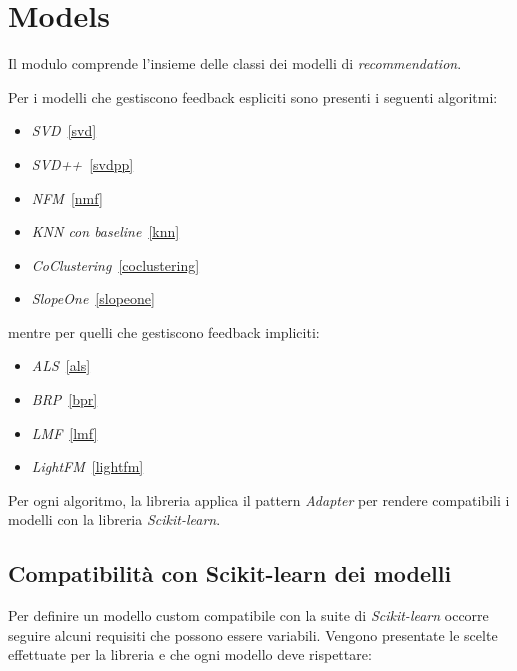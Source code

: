 \section{Models}
Il modulo comprende l'insieme delle classi dei modelli di \textit{recommendation}.

Per i modelli che gestiscono feedback espliciti sono presenti i seguenti algoritmi:

\begin{itemize}
    \item \textit{SVD}~\ref{svd}
    \item \textit{SVD++}~\ref{svdpp}
    \item \textit{NFM}~\ref{nmf}
    \item \textit{KNN con baseline}~\ref{knn}
    \item \textit{CoClustering}~\ref{coclustering}
    \item \textit{SlopeOne}~\ref{slopeone}
\end{itemize}

mentre per quelli che gestiscono feedback impliciti:

\begin{itemize}
    \item \textit{ALS}~\ref{als} 
    \item \textit{BRP}~\ref{bpr} 
    \item \textit{LMF}~\ref{lmf}
    \item \textit{LightFM}~\ref{lightfm}  
\end{itemize}

Per ogni algoritmo, la libreria applica il pattern \textit{Adapter} per rendere compatibili i modelli con la libreria \textit{Scikit-learn}.

\subsection{Compatibilità con Scikit-learn dei modelli}\label{compatibilita_sklearn}

Per definire un modello custom compatibile con la suite di \textit{Scikit-learn} occorre seguire alcuni requisiti che possono essere variabili. Vengono presentate le scelte effettuate per la libreria e che ogni modello deve rispettare:

